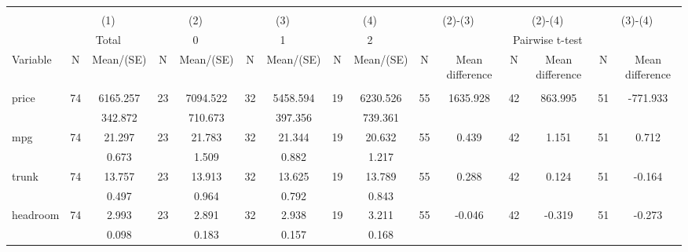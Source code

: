 
\begin{tabular}{@{\extracolsep{5pt}}lcccccccccccccc}
\\[-1.8ex]\hline \hline \\[-1.8ex]
 & \multicolumn{2}{c}{(1)}  & \multicolumn{2}{c}{(2)}  & \multicolumn{2}{c}{(3)}  & \multicolumn{2}{c}{(4)}  & \multicolumn{2}{c}{(2)-(3)} & \multicolumn{2}{c}{(2)-(4)} & \multicolumn{2}{c}{(3)-(4)} \\
 & \multicolumn{2}{c}{Total}  & \multicolumn{2}{c}{0}  & \multicolumn{2}{c}{1}  & \multicolumn{2}{c}{2}  & \multicolumn{6}{c}{Pairwise t-test}  \\
Variable & N & Mean/(SE) & N & Mean/(SE) & N & Mean/(SE) & N & Mean/(SE) & N & Mean difference & N & Mean difference & N & Mean difference \\ \hline \\[-1.8ex] 
price   & 74    &  6165.257    & 23    &  7094.522    & 32    &  5458.594    & 19    &  6230.526    & 55    &  1635.928    & 42    &   863.995    & 51    &  -771.933   \\
 &   &   342.872  &   &   710.673  &   &   397.356  &   &   739.361  &   &  &   &  &   &   \\
mpg   & 74    &    21.297    & 23    &    21.783    & 32    &    21.344    & 19    &    20.632    & 55    &     0.439    & 42    &     1.151    & 51    &     0.712   \\
 &   &     0.673  &   &     1.509  &   &     0.882  &   &     1.217  &   &  &   &  &   &   \\
trunk   & 74    &    13.757    & 23    &    13.913    & 32    &    13.625    & 19    &    13.789    & 55    &     0.288    & 42    &     0.124    & 51    &    -0.164   \\
 &   &     0.497  &   &     0.964  &   &     0.792  &   &     0.843  &   &  &   &  &   &   \\
headroom   & 74    &     2.993    & 23    &     2.891    & 32    &     2.938    & 19    &     3.211    & 55    &    -0.046    & 42    &    -0.319    & 51    &    -0.273   \\
 &   &     0.098  &   &     0.183  &   &     0.157  &   &     0.168  &   &  &   &  &   &   \\

\end{tabular}

